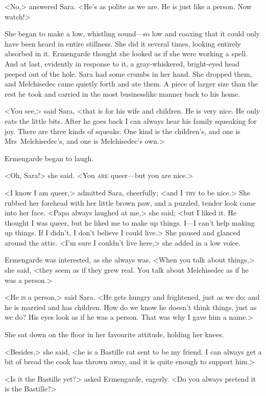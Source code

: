 <No,> answered Sara. <He's as polite as we are. He is just like a person. Now watch!>

She began to make a low, whistling sound—so low and coaxing that it could only have been heard in entire stillness. She did it several times, looking entirely absorbed in it. Ermengarde thought she looked as if she were working a spell. And at last, evidently in response to it, a gray-whiskered, bright-eyed head peeped out of the hole. Sara had some crumbs in her hand. She dropped them, and Melchisedec came quietly forth and ate them. A piece of larger size than the rest he took and carried in the most businesslike manner back to his home.

<You see,> said Sara, <that is for his wife and children. He is very nice. He only eats the little bits. After he goes back I can always hear his family squeaking for joy. There are three kinds of squeaks. One kind is the children's, and one is Mrs~Melchisedec's, and one is Melchisedec's own.>

Ermengarde began to laugh.

<Oh, Sara!> she said. <You \textsc{are} queer—but you are nice.>

<I know I am queer,> admitted Sara, cheerfully; <and I \textsc{try} to be nice.> She rubbed her forehead with her little brown paw, and a puzzled, tender look came into her face. <Papa always laughed at me,> she said; <but I liked it. He thought I was queer, but he liked me to make up things. I—I can't help making up things. If I didn't, I don't believe I could live.> She paused and glanced around the attic. <I'm sure I couldn't live here,> she added in a low voice.

Ermengarde was interested, as she always was. <When you talk about things,> she said, <they seem as if they grew real. You talk about Melchisedec as if he was a person.>

<He \textsc{is} a person,> said Sara. <He gets hungry and frightened, just as we do; and he is married and has children. How do we know he doesn't think things, just as we do? His eyes look as if he was a person. That was why I gave him a name.>

She sat down on the floor in her favourite attitude, holding her knees.

<Besides,> she said, <he is a Bastille rat sent to be my friend. I can always get a bit of bread the cook has thrown away, and it is quite enough to support him.>

<Is it the Bastille yet?> asked Ermengarde, eagerly. <Do you always pretend it is the Bastille?>

